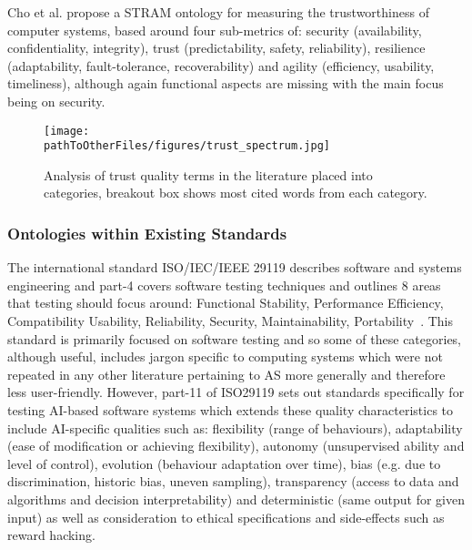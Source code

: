 Cho et al. propose a STRAM ontology for measuring the trustworthiness of computer systems, based around four sub-metrics of: security (availability, confidentiality, integrity), trust (predictability, safety, reliability), resilience (adaptability, fault-tolerance, recoverability) and agility (efficiency, usability, timeliness), although again functional aspects are missing with the main focus being on security.

\begin{figure*}[]
    \centering
    \texttt{[image: \\pathToOtherFiles/figures/trust\_spectrum.jpg]}
    \caption{Analysis of trust quality terms in the literature placed into categories, breakout box shows most cited words from each category.}
    \label{fig:trust_spectrum}
\end{figure*}


\subsubsection{Ontologies within Existing Standards}

The international standard ISO/IEC/IEEE 29119 describes software and systems engineering and part-4 covers software testing techniques and outlines 8 areas that testing should focus around: Functional Stability, Performance Efficiency, Compatibility
Usability, Reliability, Security, Maintainability, Portability~\cite{ISO29119}. 
%
This standard is primarily focused on software testing and so some of these categories, although useful, includes jargon specific to computing systems which were not repeated in any other literature pertaining to AS more generally and therefore less user-friendly. However, part-11 of ISO29119 sets out standards specifically for testing AI-based software systems which extends these quality characteristics to include AI-specific qualities such as: flexibility (range of behaviours), adaptability (ease of modification or achieving flexibility), autonomy (unsupervised ability and level of control), evolution (behaviour adaptation over time), bias (e.g. due to discrimination, historic bias, uneven sampling), transparency (access to data and algorithms and decision interpretability) and deterministic (same output for given input) as well as consideration to ethical specifications and side-effects such as reward hacking. 

